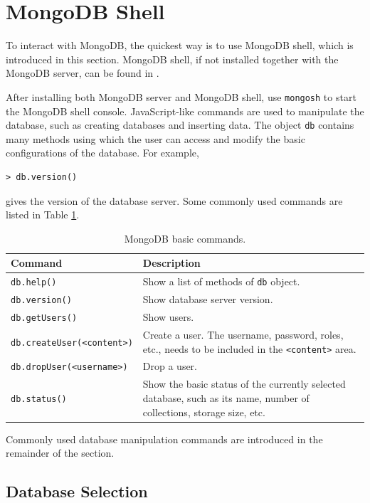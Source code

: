 \section{MongoDB Shell} \label{sec:mongosh}

To interact with MongoDB, the quickest way is to use MongoDB shell, which is introduced in this section. MongoDB shell, if not installed together with the MongoDB server, can be found in \cite{mongodb_shell_download}. 

After installing both MongoDB server and MongoDB shell, use \verb|mongosh| to start the MongoDB shell console. JavaScript-like commands are used to manipulate the database, such as creating databases and inserting data. The object \verb|db| contains many methods using which the user can access and modify the basic configurations of the database. For example,
\begin{lstlisting}
> db.version()
\end{lstlisting}
gives the version of the database server. Some commonly used commands are listed in Table \ref{ch:db:tab:mongodbbasics}.
\begin{table}[!htb]
	\centering \caption{MongoDB basic commands.}\label{ch:db:tab:mongodbbasics}
	\begin{tabularx}{\textwidth}{lX}
		\hline
		Command & Description \\ \hline
		\verb|db.help()| & Show a list of methods of \verb|db| object. \\ 
		\verb|db.version()| & Show database server version. \\ 
		\verb|db.getUsers()| & Show users. \\ 
		\verb|db.createUser(<content>)| & Create a user. The username, password, roles, etc., needs to be included in the \verb|<content>| area. \\ 
		\verb|db.dropUser(<username>)| & Drop a user. \\ 
		\verb|db.status()| & Show the basic status of the currently selected database, such as its name, number of collections, storage size, etc.  \\
		\hline
	\end{tabularx}
\end{table}

Commonly used database manipulation commands are introduced in the remainder of the section.

\subsection{Database Selection}

